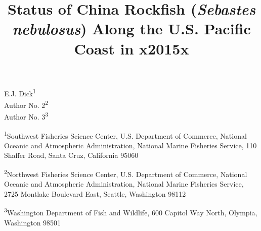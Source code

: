 \documentclass[12pt,]{article}
\title{Status of China Rockfish (\emph{Sebastes nebulosus}) Along the U.S.
Pacific Coast in x2015x}
\author{}
\date{}
\begin{document}
\maketitle


\begin{center}
\thispagestyle{empty}


\vspace{.5cm}




E.J. Dick\textsuperscript{1}\\
Author No. 2\textsuperscript{2}\\
Author No. 3\textsuperscript{3}\\

\vspace{.5cm}

\small
\textsuperscript{1}Southwest Fisheries Science Center, U.S. Department of Commerce, National Oceanic and Atmospheric Administration, National Marine Fisheries Service, 110 Shaffer Road, Santa Cruz, California 95060\\

\vspace{.3cm}

\textsuperscript{2}Northwest Fisheries Science Center, U.S. Department of Commerce, National Oceanic and Atmospheric Administration, National Marine Fisheries Service, 2725 Montlake Boulevard East, Seattle, Washington 98112\\

\vspace{.3cm}

\textsuperscript{3}Washington Department of Fish and Wildlife, 600 Capitol Way North, Olympia, Washington 98501\\


\end{center}
\end{document}
